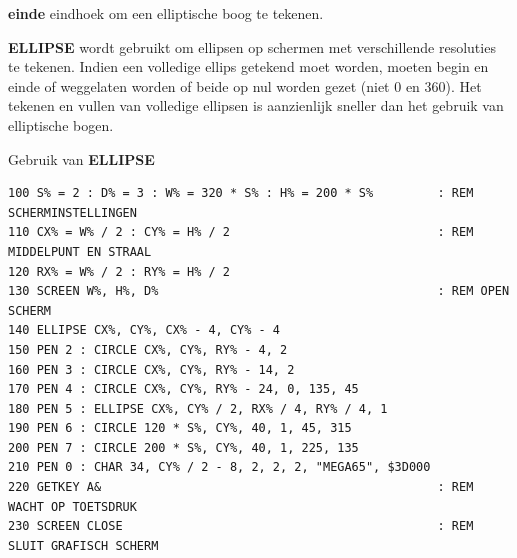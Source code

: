 \begin{description}[leftmargin=2cm,style=nextline]
                  {\bf einde} eindhoek om een elliptische boog te tekenen.

\item [Opmerkingen:]  {\bf ELLIPSE} wordt gebruikt om ellipsen op schermen met verschillende resoluties te tekenen. Indien een volledige ellips getekend moet worden, moeten begin en einde of weggelaten worden of beide op nul worden gezet (niet 0 en 360). Het tekenen en vullen van volledige ellipsen is aanzienlijk sneller dan het gebruik van elliptische bogen.

\item [Voorbeeld:]  Gebruik van {\bf ELLIPSE}

\begin{tcolorbox}[colback=black,coltext=white]
\verbatimfont{\codefont}
\begin{verbatim}
100 S% = 2 : D% = 3 : W% = 320 * S% : H% = 200 * S%         : REM SCHERMINSTELLINGEN
110 CX% = W% / 2 : CY% = H% / 2                             : REM MIDDELPUNT EN STRAAL
120 RX% = W% / 2 : RY% = H% / 2
130 SCREEN W%, H%, D%                                       : REM OPEN SCHERM
140 ELLIPSE CX%, CY%, CX% - 4, CY% - 4
150 PEN 2 : CIRCLE CX%, CY%, RY% - 4, 2
160 PEN 3 : CIRCLE CX%, CY%, RY% - 14, 2
170 PEN 4 : CIRCLE CX%, CY%, RY% - 24, 0, 135, 45
180 PEN 5 : ELLIPSE CX%, CY% / 2, RX% / 4, RY% / 4, 1
190 PEN 6 : CIRCLE 120 * S%, CY%, 40, 1, 45, 315
200 PEN 7 : CIRCLE 200 * S%, CY%, 40, 1, 225, 135
210 PEN 0 : CHAR 34, CY% / 2 - 8, 2, 2, 2, "MEGA65", $3D000
220 GETKEY A&                                               : REM WACHT OP TOETSDRUK
230 SCREEN CLOSE                                            : REM SLUIT GRAFISCH SCHERM
\end{verbatim}
\end{tcolorbox}

\end{description}


\newpage
